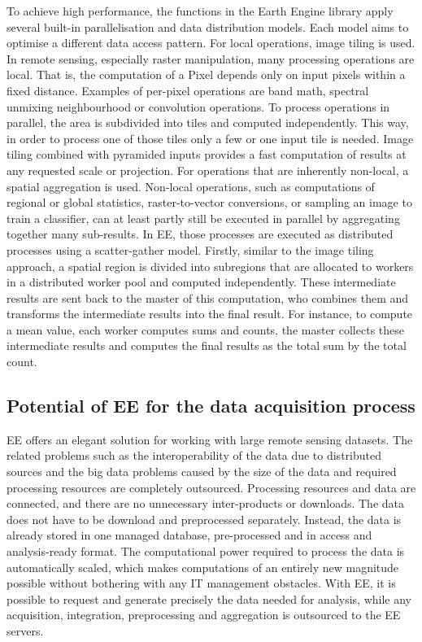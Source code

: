 To achieve high performance, the functions in the Earth Engine library apply several built-in parallelisation and data distribution models. Each model aims to optimise a different data access pattern.
For local operations, image tiling is used.
In remote sensing, especially raster manipulation, many processing operations are local. That is, the computation of a Pixel depends only on input pixels within a fixed distance. Examples of per-pixel operations are band math, spectral unmixing neighbourhood or convolution operations. To process operations in parallel, the area is subdivided into tiles and computed independently. This way, in order to process one of those tiles only a few or one input tile is needed. Image tiling combined with pyramided inputs provides a fast computation of results at any requested scale or projection.
For operations that are inherently non-local, a spatial aggregation is used.
Non-local operations, such as computations of regional or global statistics, raster-to-vector conversions, or sampling an image to train a classifier, can at least partly still be executed in parallel by aggregating together many sub-results. In EE, those processes are executed as distributed processes using a scatter-gather model. Firstly, similar to the image tiling approach, a spatial region is divided into subregions that are allocated to workers in a distributed worker pool and computed independently. These intermediate results are sent back to the master of this computation, who combines them and transforms the intermediate results into the final result. For instance, to compute a mean value, each worker computes sums and counts, the master collects these intermediate results and computes the final results as the total sum by the total count.

\subsection{Potential of EE for the data acquisition process}

EE offers an elegant solution for working with large remote sensing datasets. The related problems such as the interoperability of the data due to distributed sources and the big data problems caused by the size of the data and required processing resources are completely outsourced. 
Processing resources and data are connected, and there are no unnecessary inter-products or downloads. 
The data does not have to be download and preprocessed separately. Instead, the data is already stored in one managed database, pre-processed and in access and analysis-ready format. 
The computational power required to process the data is automatically scaled, which makes computations of an entirely new magnitude possible without bothering with any IT management obstacles.
With EE, it is possible to request and generate precisely the data needed for analysis, while any acquisition, integration, preprocessing and aggregation is outsourced to the EE servers. 

